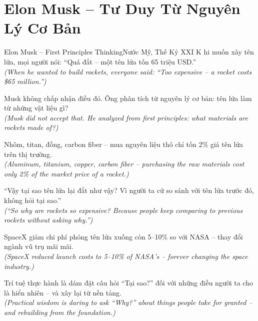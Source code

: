 \section{Elon Musk -- Tư Duy Từ Nguyên Lý Cơ Bản}
\begin{truyen}{Elon Musk -- First Principles Thinking}{Nước Mỹ, Thế Kỷ XXI}
K hi muốn xây tên lửa, mọi người nói: ``Quá đắt -- một tên lửa tốn 65 triệu USD.''\\
\textit{(When he wanted to build rockets, everyone said: ``Too expensive -- a rocket costs \$65 million.'')}

Musk không chấp nhận điều đó. Ông phân tích từ nguyên lý cơ bản: tên lửa làm từ những vật liệu gì?\\
\textit{(Musk did not accept that. He analyzed from first principles: what materials are rockets made of?)}

Nhôm, titan, đồng, carbon fiber -- mua nguyên liệu thô chỉ tốn 2\% giá tên lửa trên thị trường.\\
\textit{(Aluminum, titanium, copper, carbon fiber -- purchasing the raw materials cost only 2\% of the market price of a rocket.)}

``Vậy tại sao tên lửa lại đắt như vậy? Vì người ta cứ so sánh với tên lửa trước đó, không hỏi tại sao.''\\
\textit{(``So why are rockets so expensive? Because people keep comparing to previous rockets without asking why.'')}

SpaceX giảm chi phí phóng tên lửa xuống còn 5--10\% so với NASA -- thay đổi ngành vũ trụ mãi mãi.\\
\textit{(SpaceX reduced launch costs to 5--10\% of NASA's -- forever changing the space industry.)}

\end{truyen}
\begin{baihoc}
  Trí tuệ thực hành là dám đặt câu hỏi ``Tại sao?'' đối với những điều người ta cho là hiển nhiên -- và xây lại từ nền tảng.\\
  \textit{(Practical wisdom is daring to ask ``Why?'' about things people take for granted -- and rebuilding from the foundation.)}
\end{baihoc}
